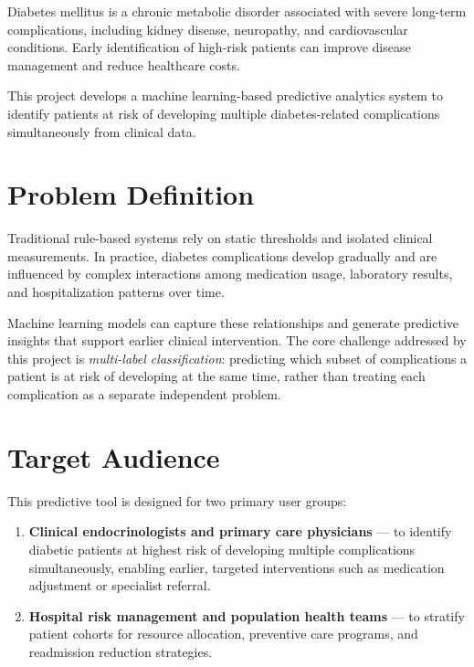 \documentclass[12pt]{article}
\begin{document}
Diabetes mellitus is a chronic metabolic disorder associated with severe long-term
complications, including kidney disease, neuropathy, and cardiovascular conditions.
Early identification of high-risk patients can improve disease management and reduce
healthcare costs.

This project develops a machine learning-based predictive analytics system to identify
patients at risk of developing multiple diabetes-related complications simultaneously
from clinical data.


\section{Problem Definition}

Traditional rule-based systems rely on static thresholds and isolated clinical
measurements. In practice, diabetes complications develop gradually and are influenced
by complex interactions among medication usage, laboratory results, and hospitalization
patterns over time.

Machine learning models can capture these relationships and generate predictive insights
that support earlier clinical intervention. The core challenge addressed by this project
is \textit{multi-label classification}: predicting which subset of complications a
patient is at risk of developing at the same time, rather than treating each complication
as a separate independent problem.


\section{Target Audience}

This predictive tool is designed for two primary user groups:

\begin{enumerate}
  \item \textbf{Clinical endocrinologists and primary care physicians} --- to identify
        diabetic patients at highest risk of developing multiple complications
        simultaneously, enabling earlier, targeted interventions such as medication
        adjustment or specialist referral.

  \item \textbf{Hospital risk management and population health teams} --- to stratify
        patient cohorts for resource allocation, preventive care programs, and
        readmission reduction strategies.
\end{enumerate}
\end{document}
